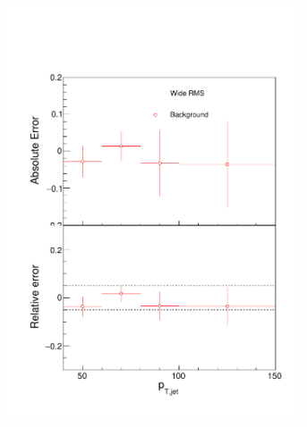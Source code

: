 \begin{figure}
\centering
\begin{subfigure}{0.24\textwidth}
\includegraphics[width=0.95\textwidth]{results/SystematicErrors/SystematicErrorsGammaRMS_BgNFin00JetPt08_linx_data}
\end{subfigure}
\begin{subfigure}{0.24\textwidth}

\end{subfigure}
\end{figure}
